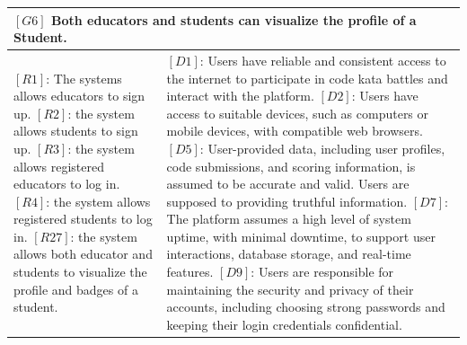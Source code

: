 \begin{table}[H]
  \centering
\begin{tabular}{|p{8cm}|p{8cm}|}
  \hline
  \multicolumn{2}{|p{16cm}|}{\textbf{$[G6]$ Both educators and students can visualize the profile of a Student.}} \\
  \hline
  {
  $[R1]$: The systems allows educators to sign up.
  \newline$[R2]$: the system allows students to sign up.
  \newline$[R3]$: the system allows registered educators to log in.
  \newline$[R4]$: the system allows registered students to log in.
  \newline$[R27]$: the system allows both educator and students to visualize the profile and badges of a student.
  }
  & 
  {
  $[D1]$: Users have reliable and consistent access to the internet to participate in code kata battles and interact with the platform.
  \newline$[D2]$: Users have access to suitable devices, such as computers or mobile devices, with compatible web browsers.
  \newline$[D5]$: User-provided data, including user profiles, code submissions, and scoring information, is assumed to be accurate and valid. Users are supposed to providing truthful information.
  \newline$[D7]$: The platform assumes a high level of system uptime, with minimal downtime, to support user interactions, database storage, and real-time features.
  \newline$[D9]$: Users are responsible for maintaining the security and privacy of their accounts, including choosing strong passwords and keeping their login credentials confidential.
  }
  \\
  \hline
\end{tabular}
\end{table}

